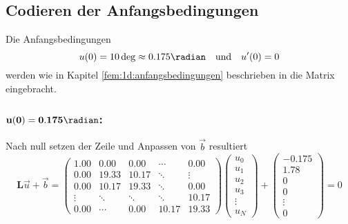 \subsection{Codieren der Anfangsbedingungen}
Die Anfangsbedingungen
\begin{equation}
    u(0) = 10 \deg \approx 0.175 \radian
    \quad \text{und} \quad
    u'(0) = 0
\end{equation}
werden wie in Kapitel \ref{fem:1d:anfangsbedingungen} beschrieben in die Matrix eingebracht.

\subsubsection{$\mathbf{u(0) = 0.175 \radian}$:}
Nach null setzen der Zeile und Anpassen von $\vec{b}$ resultiert
\begin{equation}
    \mathbf{L}\vec{u} + \vec{b} 
    = \left(\begin{matrix}
         1.00  &  0.00  &  0.00  & \cdots & 0.00 \\
         0.00  & 19.33  & 10.17  & \ddots & \vdots \\
         0.00  & 10.17  & 19.33  & \ddots & 0.00 \\
        \vdots & \ddots & \ddots & \ddots & 10.17 \\
         0.00  & \cdots & 0.00   & 10.17  & 19.33
    \end{matrix}\right)
    \left(\begin{matrix}
        u_0 \\ u_1 \\ u_2 \\ u_3 \\ \vdots \\ u_N
    \end{matrix}\right)
    +
    \left(\begin{matrix}
        -0.175 \\ 1.78 \\ 0 \\ 0 \\ \vdots \\ 0
    \end{matrix}\right)
    = 0
\end{equation}

